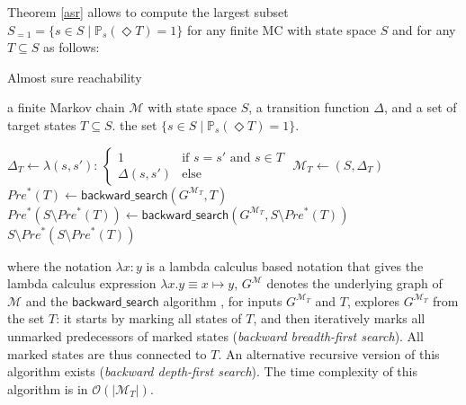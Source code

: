 Theorem \ref{asr} allows to compute the largest subset $S_{=1} = \{s \in S \; | \; \mathbb{P}_s(\Diamond T) = 1 \}$ for any finite MC with state space $S$ and for any $T \subseteq S$ as follows:
\begin{algorithm}[H]
\caption{Almost sure reachability}\label{almost-sure-algo}
\begin{algorithmic}[1]
  \REQUIRE a finite Markov chain $\mathcal{M}$ with state space $S$, a transition function $\Delta$, and a set of target states $T \subseteq S$.
  \ENSURE the set $\{ s \in S \; | \; \mathbb{P}_s(\Diamond T) = 1\}$.
  \item[]
  \STATE $\Delta_T \leftarrow \lambda (s, s'):\, \begin{cases}
    1 &\text{if } s = s' \text{ and } s \in T\\
    \Delta(s, s') &\text{else}
  \end{cases}$
  \STATE $\mathcal{M}_T \leftarrow (S, \Delta_T)$
  \STATE $Pre^*(T) \leftarrow \mathsf{backward\_search}(G^{\mathcal{M}_T}, T)$
  \STATE $Pre^*(S \setminus Pre^*(T)) \leftarrow \mathsf{backward\_search}(G^{\mathcal{M}_T}, S \setminus Pre^*(T))$
  \RETURN $S \setminus Pre^*(S \setminus Pre^*(T))$
\end{algorithmic}
\end{algorithm}
\noindent where the notation $\lambda x:y$ is a lambda calculus based notation that gives the lambda calculus expression $\lambda x.y \equiv x \mapsto y$, $G^\mathcal{M}$ denotes the underlying graph of $\mathcal{M}$ and the $\mathsf{backward\_search}$ algorithm
, for inputs $G^{\mathcal{M}_T}$ and $T$, explores $G^{\mathcal{M}_T}$ from the set $T$: it starts by marking all states of $T$, and then iteratively marks all unmarked predecessors of marked states (\textit{backward breadth-first search}). All marked states are thus connected to $T$. An alternative recursive version of this algorithm exists (\textit{backward depth-first search}).
The time complexity of this algorithm is in $\mathcal{O}(|\mathcal{M}_T|)$.

